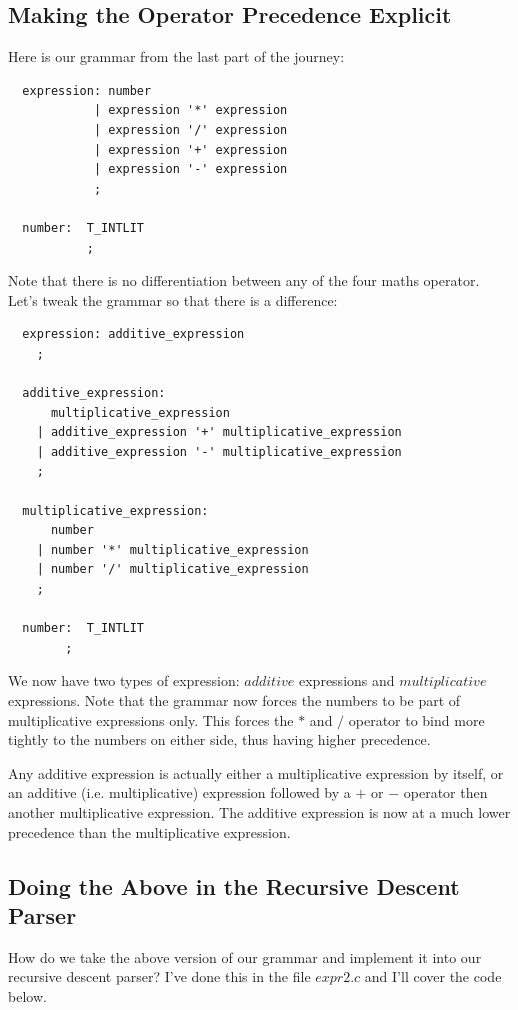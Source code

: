 \documentclass[a4paper,12pt]{article}
\begin{document}
\subsection{Making the Operator Precedence Explicit}

Here is our grammar from the last part of the journey:

\begin{lstlisting}
  expression: number
            | expression '*' expression
            | expression '/' expression
            | expression '+' expression
            | expression '-' expression
            ;

  number:  T_INTLIT
           ;
\end{lstlisting}

Note that there is no differentiation between any of the four maths operator. Let's tweak the grammar so that there is a difference:

\begin{lstlisting}
  expression: additive_expression
    ;

  additive_expression:
      multiplicative_expression
    | additive_expression '+' multiplicative_expression
    | additive_expression '-' multiplicative_expression
    ;

  multiplicative_expression:
      number
    | number '*' multiplicative_expression
    | number '/' multiplicative_expression
    ;

  number:  T_INTLIT
        ;
\end{lstlisting}

We now have two types of expression: $additive$ expressions and $multiplicative$ expressions. Note that the grammar now forces the numbers to be part of multiplicative expressions only. This forces the $*$ and $/$ operator to bind more tightly to the numbers on either side, thus having higher precedence.

Any additive expression is actually either a multiplicative expression by itself, or an additive (i.e. multiplicative) expression followed by a $+$ or $-$ operator then another multiplicative expression. The additive expression is now at a much lower precedence than the multiplicative expression.

\subsection{Doing the Above in the Recursive Descent Parser}

How do we take the above version of our grammar and implement it into our recursive descent parser? I've done this in the file $expr2.c$ and I'll cover the code below.
\end{document}
